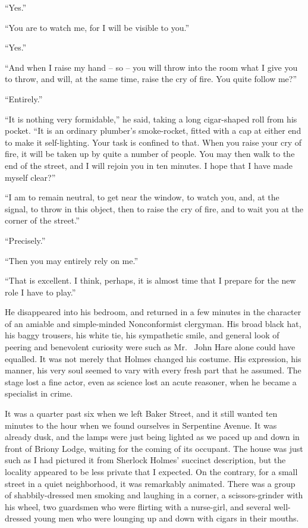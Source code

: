 “Yes.”

“You are to watch me, for I will be visible to you.”

“Yes.”

“And when I raise my hand -- so -- you will throw into the
room what I give you to throw, and will, at the same time,
raise the cry of fire. You quite follow me?”

“Entirely.”

“It is nothing very formidable,” he said, taking a long
cigar-shaped roll from his pocket. “It is an ordinary plumber’s
smoke-rocket, fitted with a cap at either end to make it
self-lighting. Your task is confined to that. When you raise
your cry of fire, it will be taken up by quite a number of people.
You may then walk to the end of the street, and I will
rejoin you in ten minutes. I hope that I have made myself
clear?”

“I am to remain neutral, to get near the window, to watch
you, and, at the signal, to throw in this object, then to raise
the cry of fire, and to wait you at the corner of the street.”

“Precisely.”

“Then you may entirely rely on me.”

“That is excellent. I think, perhaps, it is almost time that
I prepare for the new role I have to play.”

He disappeared into his bedroom, and returned in a few
minutes in the character of an amiable and simple-minded
Nonconformist clergyman. His broad black hat, his baggy
trousers, his white tie, his sympathetic smile, and general
look of peering and benevolent curiosity were such as Mr.\ %
John Hare alone could have equalled. It was not merely
that Holmes changed his costume. His expression, his manner,
his very soul seemed to vary with every fresh part that
he assumed. The stage lost a fine actor, even as science lost
an acute reasoner, when he became a specialist in crime.

It was a quarter past six when we left Baker Street, and it
still wanted ten minutes to the hour when we found ourselves
in Serpentine Avenue. It was already dusk, and the lamps
were just being lighted as we paced up and down in front of
Briony Lodge, waiting for the coming of its occupant. The
house was just such as I had pictured it from Sherlock
Holmes’ succinct description, but the locality appeared to be
less private that I expected. On the contrary, for a small
street in a quiet neighborhood, it was remarkably animated.
There was a group of shabbily-dressed men smoking and
laughing in a corner, a scissors-grinder with his wheel, two
guardsmen who were flirting with a nurse-girl, and several
well-dressed young men who were lounging up and down with
cigars in their mouths.

